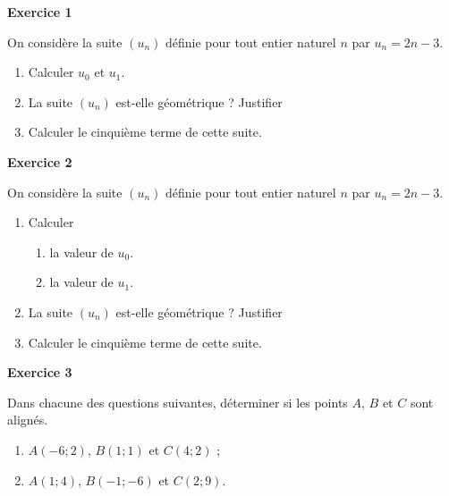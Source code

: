 \medskip

\newpage

\textbf{Exercice 1}

On considère la suite \((u_n)\) définie pour tout entier naturel \(n\)
par \(u_n = 2n-3\).

\begin{enumerate}
\def\labelenumi{\arabic{enumi})}
\tightlist
\item
  Calculer \(u_0\) et \(u_1\).
\item
  La suite \((u_n)\) est-elle géométrique ? Justifier
\item
  Calculer le cinquième terme de cette suite.
\end{enumerate}

\bigskip

\textbf{Exercice 2}

On considère la suite \((u_n)\) définie pour tout entier naturel \(n\)
par \(u_n = 2n-3\).

\begin{enumerate}
\def\labelenumi{\arabic{enumi}.}
\tightlist
\item
  Calculer

  \begin{enumerate}
  \def\labelenumii{\alph{enumii}.}
  \tightlist
  \item
    la valeur de \(u_0\).
  \item
    la valeur de \(u_1\).
  \end{enumerate}
\item
  La suite \((u_n)\) est-elle géométrique ? Justifier
\item
  Calculer le cinquième terme de cette suite.
\end{enumerate}

\bigskip

\textbf{Exercice 3}

Dans chacune des questions suivantes, déterminer si les points \(A\),
\(B\) et \(C\) sont alignés.

\begin{enumerate}
\def\labelenumi{\alph{enumi}.}
\tightlist
\item
  \(A(-6;2)\), \(B(1;1)\) et \(C(4;2)\) ;
\item
  \(A(1;4)\), \(B(-1;-6)\) et \(C(2;9)\).
\end{enumerate}
